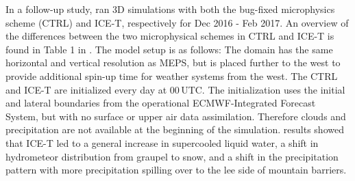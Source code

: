 \documentclass{ametsocV5}
\begin{document}
        In a follow-up study, \citet{engdahl_effects_2020} ran 3D simulations with both the bug-fixed microphysics scheme (CTRL) and ICE-T, respectively for Dec 2016 - Feb 2017. An overview of the differences between the two microphysical schemes in CTRL and ICE-T is found in Table 1 in \citet{engdahl_improving_2020}. The \citet{engdahl_effects_2020} model setup is as follows: The domain has the same horizontal and vertical resolution as MEPS, but is placed further to the west \citep{frogner_harmonepsharmonie_2019} to provide additional spin-up time for weather systems from the west. The CTRL and ICE-T are initialized every day at 00\,UTC. The initialization uses the initial and lateral boundaries from the operational ECMWF-Integrated Forecast System, but with no surface or upper air data assimilation. Therefore clouds and precipitation are not available at the beginning of the simulation. \citet{engdahl_effects_2020} results showed that ICE-T led to a general increase in supercooled liquid water, a shift in hydrometeor distribution from graupel to snow, and a shift in the precipitation pattern with more precipitation spilling over to the lee side of mountain barriers.
        
         
\end{document}
